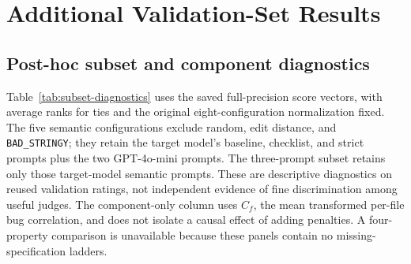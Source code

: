 \section{Additional Validation-Set Results}\label{app:moved-results}
\subsection{Post-hoc subset and component diagnostics}\label{app:subset-diagnostics}\label{app:judge-level-diagnostics}
Table~\ref{tab:subset-diagnostics} uses the saved full-precision score vectors, with average ranks for ties and the original eight-configuration normalization fixed.
The five semantic configurations exclude random, edit distance, and \texttt{BAD\_STRINGY}; they retain the target model's baseline, checklist, and strict prompts plus the two GPT-4o-mini prompts.
The three-prompt subset retains only those target-model semantic prompts.
These are descriptive diagnostics on reused validation ratings, not independent evidence of fine discrimination among useful judges.
The component-only column uses $C_f$, the mean transformed per-file bug correlation, and does not isolate a causal effect of adding penalties.
A four-property comparison is unavailable because these panels contain no missing-specification ladders.

